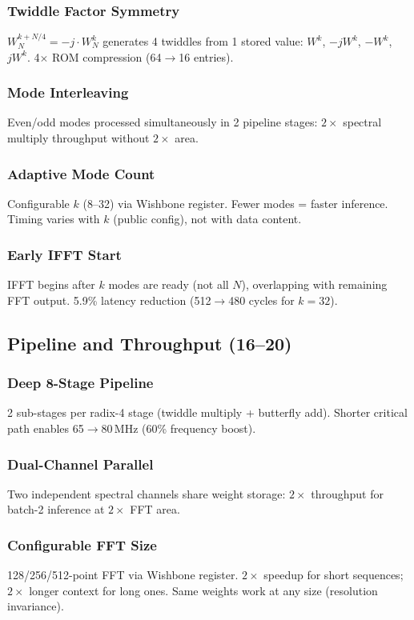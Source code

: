 \documentclass[11pt,a4paper]{article}
\theoremstyle{definition}
\theoremstyle{remark}
\begin{document}
\subsubsection{Twiddle Factor Symmetry}
$W_N^{k+N/4} = -j \cdot W_N^k$ generates 4 twiddles from 1 stored value:
$W^k$, $-jW^k$, $-W^k$, $jW^k$. 4$\times$ ROM compression (64$\to$16 entries).

\subsubsection{Mode Interleaving}
Even/odd modes processed simultaneously in 2 pipeline stages:
$2\times$ spectral multiply throughput without $2\times$ area.

\subsubsection{Adaptive Mode Count}
Configurable $k$ (8--32) via Wishbone register. Fewer modes = faster inference.
Timing varies with $k$ (public config), not with data content.

\subsubsection{Early IFFT Start}
IFFT begins after $k$ modes are ready (not all $N$), overlapping with remaining
FFT output. 5.9\% latency reduction (512$\to$480 cycles for $k=32$).

\subsection{Pipeline and Throughput (16--20)}

\subsubsection{Deep 8-Stage Pipeline}
2 sub-stages per radix-4 stage (twiddle multiply + butterfly add). Shorter
critical path enables 65$\to$80\,MHz (60\% frequency boost).

\subsubsection{Dual-Channel Parallel}
Two independent spectral channels share weight storage: $2\times$ throughput
for batch-2 inference at $2\times$ FFT area.

\subsubsection{Configurable FFT Size}
128/256/512-point FFT via Wishbone register. $2\times$ speedup for short
sequences; $2\times$ longer context for long ones. Same weights work at any size
(resolution invariance).
\end{document}
